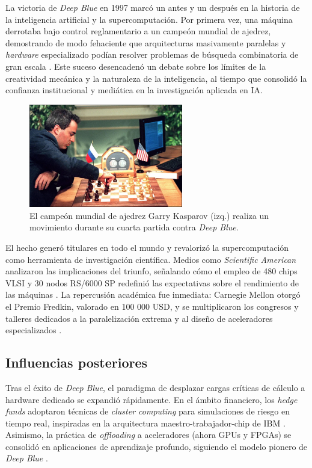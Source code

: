 \documentclass[a4paper, 12pt]{article}
\begin{document}
La victoria de \textit{Deep Blue} en 1997 marcó un antes y un 
después en la historia de la inteligencia artificial y la 
supercomputación. Por primera vez, una máquina derrotaba bajo 
control reglamentario a un campeón mundial de ajedrez, 
demostrando de modo fehaciente que arquitecturas masivamente 
paralelas y \emph{hardware} especializado podían resolver 
problemas de búsqueda combinatoria de gran escala 
\cite{ibmHistoryDeepBlue,greenemeier2017}. Este suceso desencadenó un 
debate sobre los límites de la creatividad mecánica y la naturaleza 
de la inteligencia, al tiempo que consolidó la confianza 
institucional y mediática en la investigación aplicada en IA.

\begin{figure}[h]
    \centering
    \includegraphics[width=0.6\textwidth]{assets/deepbluevskasparov.jpg}
    \caption{El campeón mundial de ajedrez Garry Kasparov (izq.) realiza un movimiento durante su cuarta partida contra \emph{Deep Blue}.}
    \label{fig:deepblue}
\end{figure}


El hecho generó titulares en todo el mundo y 
revalorizó la supercomputación como herramienta de investigación 
científica. Medios como \emph{Scientific American} analizaron las 
implicaciones del triunfo, señalando cómo el empleo de 480 chips 
VLSI y 30 nodos RS/6000 SP redefinió las expectativas sobre el 
rendimiento de las máquinas \cite{greenemeier2017}. La repercusión 
académica fue inmediata: Carnegie Mellon otorgó el Premio Fredkin, 
valorado en 100 000 USD, y se multiplicaron los congresos y 
talleres dedicados a la paralelización extrema y al diseño de 
aceleradores especializados \cite{ibmHistoryDeepBlue}.

\subsection{Influencias posteriores}

Tras el éxito de \textit{Deep Blue}, el paradigma de desplazar 
cargas críticas de cálculo a hardware dedicado se expandió 
rápidamente. En el ámbito financiero, los \emph{hedge funds} 
adoptaron técnicas de \emph{cluster computing} para simulaciones de 
riesgo en tiempo real, inspiradas en la arquitectura 
maestro-trabajador-chip de IBM \cite{aung2010}. Asimismo, la práctica 
de \emph{offloading} a 
aceleradores (ahora GPUs y FPGAs) se consolidó en aplicaciones de 
aprendizaje profundo, siguiendo el modelo pionero de \textit{Deep 
Blue} \cite{forbes2019explainable}.
\end{document}

